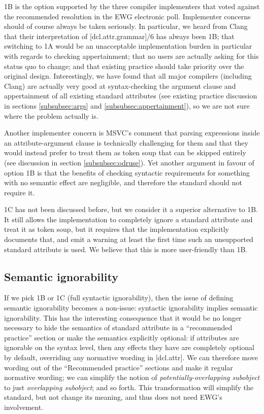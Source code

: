 1B is the option supported by the three compiler implementers that voted against the recommended resolution in the EWG electronic poll. Implementer concerns should of course always be taken seriously. In particular, we heard from Clang that their interpretation of [dcl.attr.grammar]/6 has always been 1B; that switching to 1A would be an unacceptable implementation burden in particular with regards to checking  appertainment;  that no users are actually asking for this status quo to change; and that existing practice should take priority over the original design. Interestingly, we have found that all major compilers (including Clang) are actually very good at syntax-checking the argument clause and appertainment of all existing standard attributes (see existing practice discussion in sections \ref{subsubsec:args} and \ref{subsubsec:appertainment}), so we are not sure where the problem actually is.

Another implementer concern is MSVC's comment that parsing expressions inside an attribute-argument clause is technically challenging for them and that they would instead prefer to treat them as token soup that can be skipped entirely (see discussion in section \ref{subsubsec:odruse}). Yet another argument in favour of option 1B is that the benefits of checking syntactic requirements for something with no semantic effect are negligible, and therefore the standard should not require it.

1C has not been discussed before, but we consider it a superior alternative to 1B. It still allows the implementation to completely ignore a standard attribute and treat it as token soup, but it requires that the implementation explicitly documents that, and emit a warning at least the first time such an unsupported standard attribute is used. We believe that this is more user-friendly than 1B.

\subsection{Semantic ignorability}

If we pick 1B or 1C (full syntactic ignorability), then the issue of defining semantic ignorability becomes a non-issue: syntactic ignorability implies semantic ignorability. This has the interesting consequence that it would be no longer necessary to hide the semantics of standard attribute in a ``recommended practice'' section or make the semantics explicitly optional: if attributes are ignorable on the syntax level, then any effects they have are completely optional by default, overriding any normative wording in [dcl.attr]. We can therefore move wording out of the ``Recommended practice'' sections and make it regular normative wording; we can simplify the notion of \emph{potentially-overlapping subobject} to just \emph{overlapping subobject}; and so forth. This transformation will simplify the standard, but not change its meaning, and thus does not need EWG's involvement.

